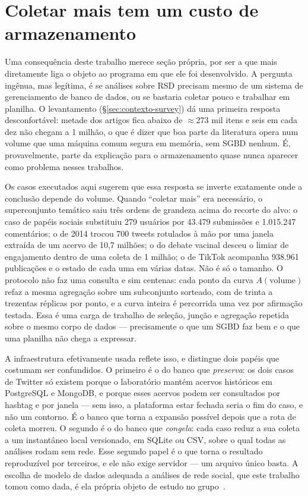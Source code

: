 \section{Coletar mais tem um custo de armazenamento}
\label{sec:banco-de-dados}

Uma consequência deste trabalho merece seção própria, por ser a que mais diretamente
liga o objeto ao programa em que ele foi desenvolvido. A pergunta ingênua, mas
legítima, é se análises sobre RSD precisam mesmo de um sistema de gerenciamento de banco
de dados, ou se bastaria coletar pouco e trabalhar em planilha. O levantamento
(\S\ref{sec:contexto-survey}) dá uma primeira resposta desconfortável: metade dos
artigos fica abaixo de $\approx$273 mil itens e seis em cada dez não chegam a 1 milhão,
o que é dizer que boa parte da literatura opera num volume que uma máquina comum
segura em memória, sem SGBD nenhum. É, provavelmente, parte da explicação para o
armazenamento quase nunca aparecer como problema nesses trabalhos.

Os casos executados aqui sugerem que essa resposta se inverte exatamente onde a
conclusão depende do volume. Quando ``coletar mais'' era necessário, o superconjunto
temático saiu três ordens de grandeza acima do recorte do alvo: o caso de papéis sociais
substituiu 279 usuários por 43.479 submissões e 1.015.247 comentários; o de 2014 trocou
700 tweets rotulados à mão por uma janela extraída de um acervo de 10,7 milhões; o do
debate vacinal desceu o limiar de engajamento dentro de uma coleta de 1 milhão; o de
TikTok acompanha 938.961 publicações e o estado de cada uma em várias datas. Não é só
o tamanho. O protocolo não faz uma consulta e sim centenas: cada ponto da curva
$A(\text{volume})$ refaz a mesma agregação sobre um subconjunto sorteado, com de trinta a
trezentas réplicas por ponto, e a curva inteira é percorrida uma vez por afirmação
testada. Essa é uma carga de trabalho de seleção, junção e agregação repetida sobre o
mesmo corpo de dados --- precisamente o que um SGBD faz bem e o que uma planilha não
chega a expressar.

A infraestrutura efetivamente usada reflete isso, e distingue dois papéis que costumam
ser confundidos. O primeiro é o do banco que \emph{preserva}: os dois casos de Twitter
só existem porque o laboratório mantém acervos históricos em PostgreSQL e MongoDB, e
porque esses acervos podem ser consultados por hashtag e por janela --- sem isso, a
plataforma estar fechada seria o fim do caso, e não um contorno. É o banco que torna a
expansão possível depois que a rota de coleta morreu. O segundo é o do banco que
\emph{congela}: cada caso reduz a sua coleta a um instantâneo local versionado, em
SQLite ou CSV, sobre o qual todas as análises rodam sem rede. Esse segundo papel é o que
torna o resultado reproduzível por terceiros, e ele não exige servidor --- um arquivo
único basta. A escolha de modelo de dados adequada a análises de rede social, que este
trabalho tomou como dada, é ela própria objeto de estudo no
grupo~\cite{salgueiro2022dbmodels}.

